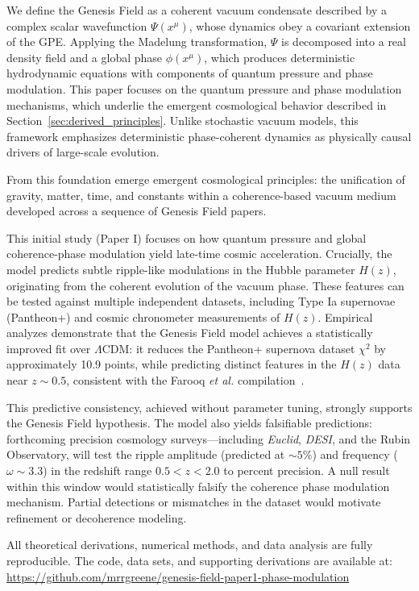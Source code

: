 We define the Genesis Field as a coherent vacuum condensate described by a complex scalar wavefunction \( \Psi(x^\mu) \), whose dynamics obey a covariant extension of the GPE. Applying the Madelung transformation, \( \Psi \) is decomposed into a real density field and a global phase \( \phi(x^\mu) \), which produces deterministic hydrodynamic equations with components of quantum pressure and phase modulation. This paper focuses on the quantum pressure and phase modulation mechanisms, which underlie the emergent cosmological behavior described in Section~\ref{sec:derived_principles}. Unlike stochastic vacuum models, this framework emphasizes deterministic phase-coherent dynamics as physically causal drivers of large-scale evolution.

From this foundation emerge emergent cosmological principles: the unification of gravity, matter, time, and constants within a coherence-based vacuum medium developed across a sequence of Genesis Field papers.

This initial study (Paper I) focuses on how quantum pressure and global coherence-phase modulation yield late-time cosmic acceleration. Crucially, the model predicts subtle ripple-like modulations in the Hubble parameter \( H(z) \), originating from the coherent evolution of the vacuum phase. These features can be tested against multiple independent datasets, including Type Ia supernovae (Pantheon+) and cosmic chronometer measurements of \( H(z) \). Empirical analyzes demonstrate that the Genesis Field model achieves a statistically improved fit over \(\Lambda\)CDM: it reduces the Pantheon+ supernova dataset \(\chi^2\) by approximately 10.9 points, while predicting distinct features in the \( H(z) \) data near \( z \sim 0.5 \), consistent with the Farooq \textit{et al.} compilation~\cite{Farooq2017}.

This predictive consistency, achieved without parameter tuning, strongly supports the Genesis Field hypothesis. The model also yields falsifiable predictions: forthcoming precision cosmology surveys—including \textit{Euclid}, \textit{DESI}, and the Rubin Observatory, will test the ripple amplitude (predicted at \(\sim 5\%\)) and frequency (\( \omega \sim 3.3 \)) in the redshift range \( 0.5 < z < 2.0 \) to percent precision. A null result within this window would statistically falsify the coherence phase modulation mechanism. Partial detections or mismatches in the dataset would motivate refinement or decoherence modeling.

All theoretical derivations, numerical methods, and data analysis are fully reproducible. The code, data sets, and supporting derivations are available at:\newline
\url{https://github.com/mrrgreene/genesis-field-paper1-phase-modulation}

